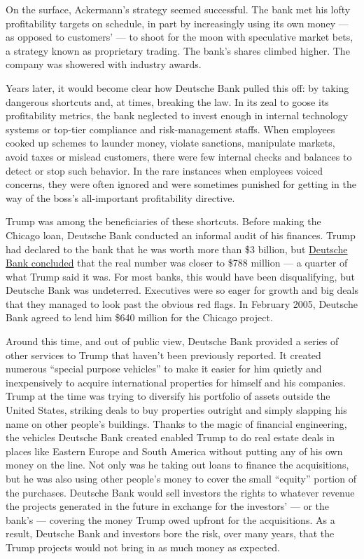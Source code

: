 On the surface, Ackermann's strategy seemed successful. The bank met his
lofty profitability targets on schedule, in part by increasingly using
its own money --- as opposed to customers' --- to shoot for the moon
with speculative market bets, a strategy known as proprietary trading.
The bank's shares climbed higher. The company was showered with industry
awards.

Years later, it would become clear how ­Deutsche Bank pulled this off:
by taking dangerous shortcuts and, at times, breaking the law. In its
zeal to goose its profitability metrics, the bank neglected to invest
enough in internal technology systems or top-tier compliance and
risk-­management staffs. When employees cooked up schemes to launder
money, violate sanctions, manipulate markets, avoid taxes or mislead
customers, there were few internal checks and balances to detect or stop
such behavior. In the rare instances when employees voiced concerns,
they were often ignored and were sometimes punished for getting in the
way of the boss's all-­important profitability directive.

Trump was among the beneficiaries of these shortcuts. Before making the
Chicago loan, ­Deutsche Bank conducted an informal audit of his
­finances. Trump had declared to the bank that he was worth more than
\$3 billion, but
­\href{https://assets.documentcloud.org/documents/2430267/trumps-lawsuit-on-net-worth.pdf}{Deutsche
Bank concluded} that the real number was closer to \$788 million --- a
quarter of what Trump said it was. For most banks, this would have been
disqualifying, but ­Deutsche Bank was undeterred. Executives were so
eager for growth and big deals that they managed to look past the
obvious red flags. In February 2005, ­Deutsche Bank agreed to lend him
\$640 million for the Chicago project.

Around this time, and out of public view, ­Deutsche Bank provided a
series of other services to Trump that haven't been previously reported.
It created numerous ``special purpose vehicles'' to make it easier for
him quietly and inexpensively to acquire international properties for
himself and his companies. Trump at the time was trying to diversify his
portfolio of assets outside the United States, striking deals to buy
properties outright and simply slapping his name on other people's
buildings. Thanks to the magic of financial engineering, the vehicles
­Deutsche Bank created enabled Trump to do real estate deals in places
like Eastern Europe and South America without putting any of his own
money on the line. Not only was he taking out loans to finance the
acquisitions, but he was also using other people's money to cover the
small ``equity'' portion of the purchases. ­Deutsche Bank would sell
investors the rights to whatever revenue the projects generated in the
future in exchange for the investors' --- or the bank's --- covering the
money Trump owed upfront for the acquisitions. As a result, ­Deutsche
Bank and investors bore the risk, over many years, that the Trump
projects would not bring in as much money as expected.

